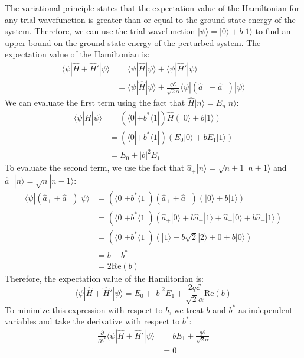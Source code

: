 \documentclass{article}
\begin{document}
The variational principle states that the expectation value of the Hamiltonian for any trial wavefunction is greater than or equal to the ground state energy of the system.  Therefore, we can use the trial wavefunction $|\psi\rangle = |0\rangle + b|1\rangle$ to find an upper bound on the ground state energy of the perturbed system.  The expectation value of the Hamiltonian is:
\begin{align*}
\langle \psi | \hat{H} + \hat{H}' | \psi \rangle &= \langle \psi | \hat{H} | \psi \rangle + \langle \psi | \hat{H}' | \psi \rangle \\
&= \langle \psi | \hat{H} | \psi \rangle + \frac{q \mathcal{E}}{\sqrt{2} \alpha} \langle \psi | (\hat{a}_+ + \hat{a}_-) | \psi \rangle
\end{align*}
We can evaluate the first term using the fact that $\hat{H} | n \rangle = E_n | n \rangle$:
\begin{align*}
\langle \psi | \hat{H} | \psi \rangle &= (\langle 0 | + b^* \langle 1 |) \hat{H} (|0\rangle + b |1\rangle) \\
&= (\langle 0 | + b^* \langle 1 |) (E_0 |0\rangle + b E_1 |1\rangle) \\
&= E_0 + |b|^2 E_1
\end{align*}
To evaluate the second term, we use the fact that $\hat{a}_+ | n \rangle = \sqrt{n+1} | n+1 \rangle$ and $\hat{a}_- | n \rangle = \sqrt{n} | n-1 \rangle$:
\begin{align*}
\langle \psi | (\hat{a}_+ + \hat{a}_-) | \psi \rangle &= (\langle 0 | + b^* \langle 1 |)(\hat{a}_+ + \hat{a}_-)(|0\rangle + b |1\rangle) \\
&= (\langle 0 | + b^* \langle 1 |)(\hat{a}_+ |0\rangle + b \hat{a}_+ |1\rangle + \hat{a}_- |0\rangle + b \hat{a}_- |1\rangle) \\
&= (\langle 0 | + b^* \langle 1 |)(|1\rangle + b \sqrt{2} |2\rangle + 0 + b |0\rangle) \\
&= b + b^* \\
&= 2 \text{Re}(b)
\end{align*}
Therefore, the expectation value of the Hamiltonian is:
\begin{equation*}
\langle \psi | \hat{H} + \hat{H}' | \psi \rangle = E_0 + |b|^2 E_1 + \frac{2q \mathcal{E}}{\sqrt{2} \alpha} \text{Re}(b)
\end{equation*}
To minimize this expression with respect to $b$, we treat $b$ and $b^*$ as independent variables and take the derivative with respect to $b^*$:
\begin{align*}
\frac{\partial}{\partial b^*} \langle \psi | \hat{H} + \hat{H}' | \psi \rangle &= b E_1 + \frac{q \mathcal{E}}{\sqrt{2} \alpha} \\
&= 0
\end{align*}
\end{document}
